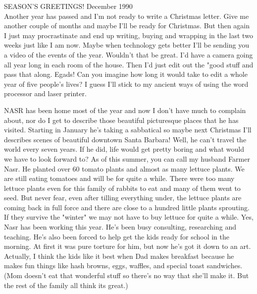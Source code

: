 
%

SEASON'S GREETINGS! \hfill December 1990\\

Another year has passed and I'm not ready to write a Christmas letter. Give me another couple of months and maybe I'll be ready for Christmas.
But then again I just may procrastinate and end up writing, buying and wrapping in the last two weeks just like I am now. Maybe when technology
gets better I'll be sending you a video of the events of the year. Wouldn't that be great. I'd have a camera going all year long in each room of
the house. Then I'd just edit out the "good stuff and pass that along. Egads! Can you imagine how long it would take to edit a whole year of
five people's lives? I guess I'll stick to my ancient ways of using the word processor and laser printer.

NASR has been home most of the year and now I don't have much to complain about, nor do I get to describe those beautiful picturesque places
that he has visited. Starting in January he's taking a sabbatical so maybe next Christmas I'll describes scenes of beautiful downtown Santa
Barbara! Well, he can't travel the world every seven years. If he did, life would get pretty boring and what would we have to look forward to?
As of this summer, you can call my husband Farmer Nasr. He planted over 60 tomato plants and almost as many lettuce plants. We are still eating
tomatoes and will be for quite a while. There were too many lettuce plants even for this family of rabbits to eat and many of them went to seed.
But never fear, even after tilling everything under, the lettuce plants are coming back in full force and there are close to a hundred little
plants sprouting. If they survive the "winter" we may not have to buy lettuce for quite a while. Yes, Nasr has been working this year. He's been
busy consulting, researching and teaching. He's also been forced to help get the kids ready for school in the morning. At first it was pure
torture for him, but now he's got it down to an art. Actually, I think the kids like it best when Dad makes breakfast because he makes fun
things like hash browns, eggs, waffles, and special toast sandwiches. (Mom doesn't eat that wonderful stuff so there's no way that she'll make
it. But the rest of the family all think its great.)


